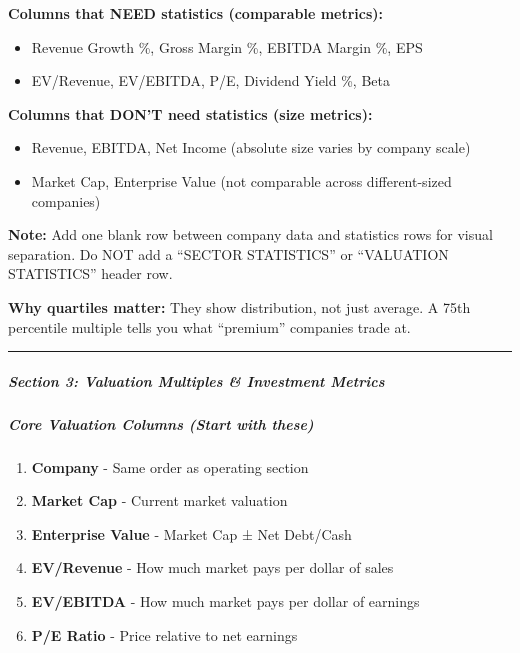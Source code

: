 \documentclass[11pt]{article}
\begin{document}
\textbf{Columns that NEED statistics (comparable metrics):}

\begin{itemize}[leftmargin=*,itemsep=2pt,topsep=2pt]
\item {} Revenue Growth \%, Gross Margin \%, EBITDA Margin \%, EPS
\item {} EV/Revenue, EV/EBITDA, P/E, Dividend Yield \%, Beta
\end{itemize}

\textbf{Columns that DON'T need statistics (size metrics):}

\begin{itemize}[leftmargin=*,itemsep=2pt,topsep=2pt]
\item {} Revenue, EBITDA, Net Income (absolute size varies by company scale)
\item {} Market Cap, Enterprise Value (not comparable across different-sized companies)
\end{itemize}

\textbf{Note:} Add one blank row between company data and statistics rows for visual separation. Do NOT add a ``SECTOR STATISTICS'' or ``VALUATION STATISTICS'' header row.


\textbf{Why quartiles matter:} They show distribution, not just average. A 75th percentile multiple tells you what ``premium'' companies trade at.


\vspace{0.5em}\hrule\vspace{0.5em}

\subparagraph{Section 3: Valuation Multiples \& Investment Metrics}\mbox{}\par

\subparagraph{Core Valuation Columns (Start with these)}\mbox{}\par
\begin{enumerate}[leftmargin=*,itemsep=2pt,topsep=2pt]
\item {} \textbf{Company} - Same order as operating section
\item {} \textbf{Market Cap} - Current market valuation
\item {} \textbf{Enterprise Value} - Market Cap ± Net Debt/Cash
\item {} \textbf{EV/Revenue} - How much market pays per dollar of sales
\item {} \textbf{EV/EBITDA} - How much market pays per dollar of earnings
\item {} \textbf{P/E Ratio} - Price relative to net earnings
\end{enumerate}
\end{document}
